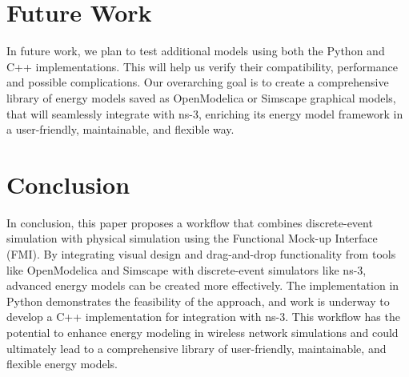 \documentclass[conference]{IEEEtran}
\def\ns3{ns-3}
\begin{document}
\section{Future Work}

In future work, we plan to test additional models using both the Python and C++ implementations. This will help us verify their compatibility, performance and possible complications.
Our overarching goal is to create a comprehensive library of energy models saved as OpenModelica or Simscape graphical models, that will seamlessly integrate with \ns3, enriching its energy model framework in a user-friendly, maintainable, and flexible way.

\section{Conclusion}
In conclusion, this paper proposes a workflow that combines discrete-event simulation with physical simulation using the Functional Mock-up Interface (FMI). By integrating visual design and drag-and-drop functionality from tools like OpenModelica and Simscape with discrete-event simulators like ns-3, advanced energy models can be created more effectively. The implementation in Python demonstrates the feasibility of the approach, and work is underway to develop a C++ implementation for integration with ns-3. This workflow has the potential to enhance energy modeling in wireless network simulations and could ultimately lead to a comprehensive library of user-friendly, maintainable, and flexible energy models.

\printbibliography
\end{document}
